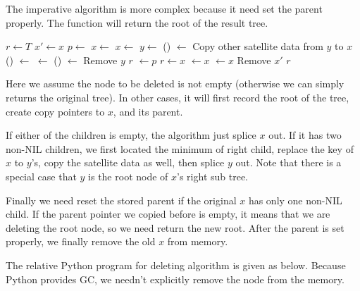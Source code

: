 \documentclass[b5paper]{article}
\begin{document}
The imperative algorithm is more complex because it need set the
parent properly. The function will return the root of the result tree.

\begin{algorithmic}[1]
  \State $r \gets T$
  \State $x' \gets x$ 
  \State $p \gets $ 
    \State $x \gets $ 
    \State $x \gets $ 
  \Else
    \State  $y \gets $ ()
    \State {} $\gets$ 
    \State Copy other satellite data from $y$ to $x$
      \State {}() $\gets$ 
    \Else
      \State {} $\gets$ 
    \EndIf
      \State {}() $\gets$ 
    \EndIf
    \State Remove $y$
    \State \Return $r$
  \EndIf
    \State {} $\gets p$
  \EndIf
    \State $r \gets x$
  \Else
      \State {} $\gets x$
    \Else
      \State {} $\gets x$
    \EndIf
  \EndIf
  \State Remove $x'$
  \State \Return $r$
\EndFunction
\end{algorithmic}

Here we assume the node to be deleted is not empty (otherwise we can
simply returns the original tree). In other cases, it will first record
the root of the tree, create copy pointers to $x$, and its parent.

If either of the children is empty, the algorithm just splice $x$ out.
If it has two non-NIL children, we first located the minimum of right
child, replace the key of $x$ to $y$'s, copy the satellite data as
well, then splice $y$ out. Note that there is a special case that $y$
is the root node of $x$'s right sub tree.

Finally we need reset the stored parent if the original $x$ has only
one non-NIL child.
If the parent pointer we copied before is empty, it
means that we are deleting the root node, so we need return the new root. After
the parent is set properly, we finally remove the old $x$ from memory.

The relative Python program for deleting algorithm is given as below.
Because Python provides GC, we needn't explicitly remove the node
from the memory.
\end{document}
